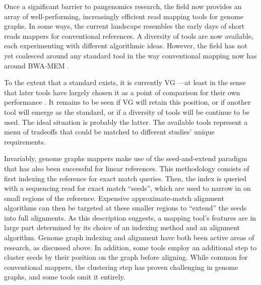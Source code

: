 Once a significant barrier to pangenomics research, the field now provides an array of well-performing, increasingly efficient read mapping tools for genome graphs. 
In some ways, the current landscape resembles the early days of short reads mappers for conventional references. 
A diversity of tools are now available, each experimenting with different algorithmic ideas. 
However, the field has not yet coalesced around any standard tool in the way conventional mapping now has around BWA-MEM \cite{Li_2013}. 

To the extent that a standard exists, it is currently VG \cite{Garrison_2018}---at least in the sense that later tools have largely chosen it as a point of comparison for their own performance \cite{Guo_2018,Kim_2019,Vaddadi_2019,Rautiainen_2019b}. 
It remains to be seen if VG will retain this position, or if another tool will emerge as the standard, or if a diversity of tools will be continue to be used. 
The ideal situation is probably the latter. 
The available tools represent a menu of tradeoffs that could be matched to different studies' unique requirements.

Invariably, genome graphs mappers make use of the seed-and-extend paradigm that has also been successful for linear references.
This methodology consists of first indexing the reference for exact match queries.
Then, the index is queried with a sequencing read for exact match ``seeds'', which are used to narrow in on small regions of the reference.
Expensive approximate-match alignment algorithms can then be targeted at these smaller regions to ``extend'' the seeds into full alignments. 
As this description suggests, a mapping tool's features are in large part determined by its choice of an indexing method and an alignment algorithm.
Genome graph indexing and alignment have both been active areas of research, as discussed above.
In addition, some tools employ an additional step to cluster seeds by their position on the graph before aligning.
While common for conventional mappers, the clustering step has proven challenging in genome graphs, and some tools omit it entirely.








